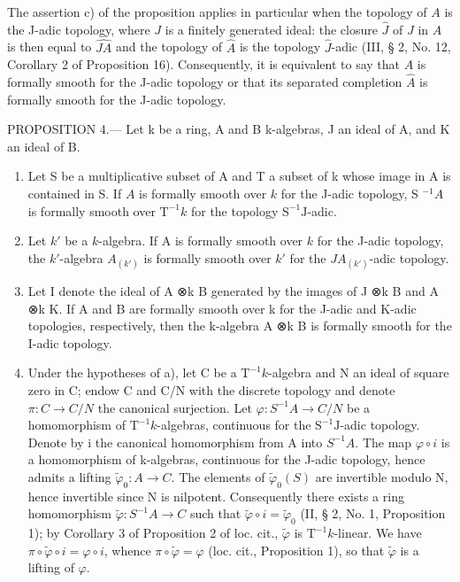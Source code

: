 The assertion c) of the proposition applies in particular when the topology of \(A\) is the J-adic topology, where \(J\) is a finitely generated ideal: the closure \(\widehat{J}\) of \(J\) in \(\widehat{A}\) is then equal to \(\widehat{JA}\) and the topology of \(\widehat{A}\) is the topology \(\widehat{J}\)-adic (III, § 2, No. 12, Corollary 2 of Proposition 16). Consequently, it is equivalent to say that \(A\) is formally smooth for the J-adic topology or that its separated completion \(\widehat{A}\) is formally smooth for the J-adic topology.

PROPOSITION 4.--- Let k be a ring, A and B k-algebras, J an ideal of A, and K an ideal of B.

\begin{enumerate}
\def\labelenumi{\alph{enumi})}
\item
  Let S be a multiplicative subset of A and T a subset of k whose image in A is contained in S. If \(A\) is formally smooth over \(k\) for the J-adic topology, S \(^{-1}A\) is formally smooth over \(\mathrm{T}^{-1}k\) for the topology \(\mathrm{S}^{-1}\mathrm{J}\)-adic.
\item
  Let \(k'\) be a \(k\)-algebra. If A is formally smooth over \(k\) for the J-adic topology, the \(k'\)-algebra \(A_{(k')}\) is formally smooth over \(k'\) for the \(JA_{(k')}\)-adic topology.
\item
  Let I denote the ideal of A ⊗k B generated by the images of J ⊗k B and A ⊗k K. If A and B are formally smooth over k for the J-adic and K-adic topologies, respectively, then the k-algebra A ⊗k B is formally smooth for the I-adic topology.
\item
  Under the hypotheses of a), let C be a \(\mathrm{T}^{-1}k\)-algebra and N an ideal of square zero in C; endow C and C/N with the discrete topology and denote \(\pi : C \to C/N\) the canonical surjection. Let \(\varphi : S^{-1}A \longrightarrow C/N\) be a homomorphism of \(\mathrm{T}^{-1}k\)-algebras, continuous for the \(\mathrm{S}^{-1}\mathrm{J}\)-adic topology. Denote by i the canonical homomorphism from A into \(S^{-1}A\). The map \(\varphi \circ i\) is a homomorphism of k-algebras, continuous for the J-adic topology, hence admits a lifting \(\tilde{\varphi}_{0} : A \to C\). The elements of \(\tilde{\varphi}_{0}(S)\) are invertible modulo N, hence invertible since N is nilpotent. Consequently there exists a ring homomorphism \(\tilde{\varphi} : S^{-1}A \to C\) such that \(\tilde{\varphi} \circ i = \tilde{\varphi}_{0}\) (II, § 2, No. 1, Proposition 1); by Corollary 3 of Proposition 2 of loc. cit., \(\tilde{\varphi}\) is \(\mathrm{T}^{-1}k\)-linear. We have \(\pi \circ \tilde{\varphi} \circ i = \varphi \circ i\), whence \(\pi \circ \tilde{\varphi} = \varphi\) (loc. cit., Proposition 1), so that \(\tilde{\varphi}\) is a lifting of \(\varphi\).

\end{enumerate}
